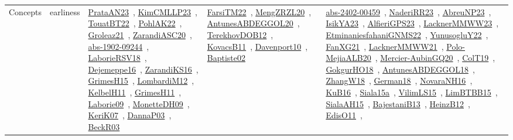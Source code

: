 {\begin{longtable}{lp{3cm}>{\raggedright\arraybackslash}p{6cm}>{\raggedright\arraybackslash}p{6cm}>{\raggedright\arraybackslash}p{8cm}}
Concepts & earliness & \href{works/PrataAN23.pdf}{PrataAN23}~\cite{PrataAN23}, \href{works/KimCMLLP23.pdf}{KimCMLLP23}~\cite{KimCMLLP23}, \href{works/TouatBT22.pdf}{TouatBT22}~\cite{TouatBT22}, \href{works/PohlAK22.pdf}{PohlAK22}~\cite{PohlAK22}, \href{works/Groleaz21.pdf}{Groleaz21}~\cite{Groleaz21}, \href{works/ZarandiASC20.pdf}{ZarandiASC20}~\cite{ZarandiASC20}, \href{works/abs-1902-09244.pdf}{abs-1902-09244}~\cite{abs-1902-09244}, \href{works/LaborieRSV18.pdf}{LaborieRSV18}~\cite{LaborieRSV18}, \href{works/Dejemeppe16.pdf}{Dejemeppe16}~\cite{Dejemeppe16}, \href{works/ZarandiKS16.pdf}{ZarandiKS16}~\cite{ZarandiKS16}, \href{works/GrimesH15.pdf}{GrimesH15}~\cite{GrimesH15}, \href{works/LombardiM12.pdf}{LombardiM12}~\cite{LombardiM12}, \href{works/KelbelH11.pdf}{KelbelH11}~\cite{KelbelH11}, \href{works/GrimesH11.pdf}{GrimesH11}~\cite{GrimesH11}, \href{works/Laborie09.pdf}{Laborie09}~\cite{Laborie09}, \href{works/MonetteDH09.pdf}{MonetteDH09}~\cite{MonetteDH09}, \href{works/KeriK07.pdf}{KeriK07}~\cite{KeriK07}, \href{works/DannaP03.pdf}{DannaP03}~\cite{DannaP03}, \href{works/BeckR03.pdf}{BeckR03}~\cite{BeckR03} & \href{works/FarsiTM22.pdf}{FarsiTM22}~\cite{FarsiTM22}, \href{works/MengZRZL20.pdf}{MengZRZL20}~\cite{MengZRZL20}, \href{works/AntunesABDEGGOL20.pdf}{AntunesABDEGGOL20}~\cite{AntunesABDEGGOL20}, \href{works/TerekhovDOB12.pdf}{TerekhovDOB12}~\cite{TerekhovDOB12}, \href{works/KovacsB11.pdf}{KovacsB11}~\cite{KovacsB11}, \href{works/Davenport10.pdf}{Davenport10}~\cite{Davenport10}, \href{works/Baptiste02.pdf}{Baptiste02}~\cite{Baptiste02} & \href{works/abs-2402-00459.pdf}{abs-2402-00459}~\cite{abs-2402-00459}, \href{works/NaderiRR23.pdf}{NaderiRR23}~\cite{NaderiRR23}, \href{works/AbreuNP23.pdf}{AbreuNP23}~\cite{AbreuNP23}, \href{works/IsikYA23.pdf}{IsikYA23}~\cite{IsikYA23}, \href{works/AlfieriGPS23.pdf}{AlfieriGPS23}~\cite{AlfieriGPS23}, \href{works/LacknerMMWW23.pdf}{LacknerMMWW23}~\cite{LacknerMMWW23}, \href{works/EtminaniesfahaniGNMS22.pdf}{EtminaniesfahaniGNMS22}~\cite{EtminaniesfahaniGNMS22}, \href{works/YunusogluY22.pdf}{YunusogluY22}~\cite{YunusogluY22}, \href{works/FanXG21.pdf}{FanXG21}~\cite{FanXG21}, \href{works/LacknerMMWW21.pdf}{LacknerMMWW21}~\cite{LacknerMMWW21}, \href{works/Polo-MejiaALB20.pdf}{Polo-MejiaALB20}~\cite{Polo-MejiaALB20}, \href{works/Mercier-AubinGQ20.pdf}{Mercier-AubinGQ20}~\cite{Mercier-AubinGQ20}, \href{works/ColT19.pdf}{ColT19}~\cite{ColT19}, \href{works/GokgurHO18.pdf}{GokgurHO18}~\cite{GokgurHO18}, \href{works/AntunesABDEGGOL18.pdf}{AntunesABDEGGOL18}~\cite{AntunesABDEGGOL18}, \href{works/ZhangW18.pdf}{ZhangW18}~\cite{ZhangW18}, \href{works/German18.pdf}{German18}~\cite{German18}, \href{works/NovaraNH16.pdf}{NovaraNH16}~\cite{NovaraNH16}, \href{works/KuB16.pdf}{KuB16}~\cite{KuB16}, \href{works/Siala15a.pdf}{Siala15a}~\cite{Siala15a}, \href{works/VilimLS15.pdf}{VilimLS15}~\cite{VilimLS15}, \href{works/LimBTBB15.pdf}{LimBTBB15}~\cite{LimBTBB15}, \href{works/SialaAH15.pdf}{SialaAH15}~\cite{SialaAH15}, \href{works/BajestaniB13.pdf}{BajestaniB13}~\cite{BajestaniB13}, \href{works/HeinzB12.pdf}{HeinzB12}~\cite{HeinzB12}, \href{works/EdisO11.pdf}{EdisO11}~\cite{EdisO11}, 
\end{longtable}}
